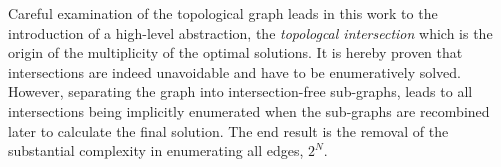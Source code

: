 \documentclass[conference]{IEEEtran}
\begin{document}

Careful examination of the topological graph leads in this work to the introduction of a high-level abstraction, the \textit{topologcal  intersection} which is the origin of the multiplicity of the optimal solutions. It is hereby proven that intersections are indeed unavoidable and have to be enumeratively solved. However, separating the graph into intersection-free sub-graphs, leads to all intersections being implicitly enumerated when the sub-graphs are recombined later to calculate the final solution. The end result is the removal of the substantial complexity in enumerating all edges, $2^N$. 
\end{document}
